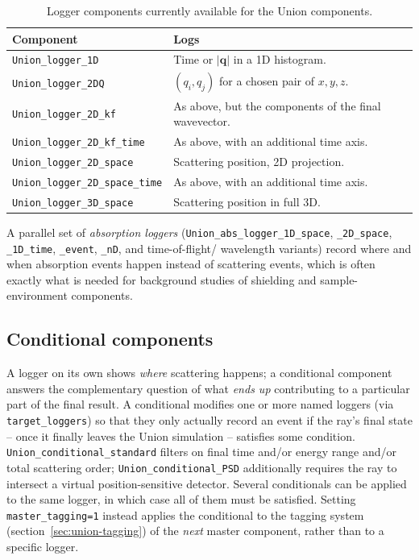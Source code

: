 \begin{table}[htb!]
  \begin{center}
    {\let\my=\\
    \begin{tabular}{|l|p{}|}
      \hline
      \textbf{Component} & \textbf{Logs} \\
      \hline
      \texttt{Union\_logger\_1D} & Time or $|\mathbf{q}|$ in a 1D histogram. \\
      \texttt{Union\_logger\_2DQ} & $(q_i,q_j)$ for a chosen pair of $x,y,z$. \\
      \texttt{Union\_logger\_2D\_kf} & As above, but the components of the final wavevector. \\
      \texttt{Union\_logger\_2D\_kf\_time} & As above, with an additional time axis. \\
      \texttt{Union\_logger\_2D\_space} & Scattering position, 2D projection. \\
      \texttt{Union\_logger\_2D\_space\_time} & As above, with an additional time axis. \\
      \texttt{Union\_logger\_3D\_space} & Scattering position in full 3D. \\
      \hline
    \end{tabular}
    \caption{Logger components currently available for the Union components.}
    \label{t:union-loggers}
    }
  \end{center}
\end{table}

A parallel set of \emph{absorption loggers}
(\texttt{Union\_abs\_logger\_1D\_space}, \texttt{\_2D\_space},
\texttt{\_1D\_time}, \texttt{\_event}, \texttt{\_nD}, and time-of-flight/
wavelength variants) record where and when absorption events happen instead
of scattering events, which is often exactly what is needed for background
studies of shielding and sample-environment components.

\subsection{Conditional components}
\label{sec:union-conditionals}

A logger on its own shows \emph{where} scattering happens; a conditional
component answers the complementary question of what \emph{ends up}
contributing to a particular part of the final result. A conditional
modifies one or more named loggers (via \texttt{target\_loggers}) so that
they only actually record an event if the ray's final state -- once it
finally leaves the Union simulation -- satisfies some condition.
\texttt{Union\_conditional\_standard} filters on final time and/or energy
range and/or total scattering order; \texttt{Union\_conditional\_PSD}
additionally requires the ray to intersect a virtual position-sensitive
detector. Several conditionals can be applied to the same logger, in which
case all of them must be satisfied. Setting \texttt{master\_tagging=1}
instead applies the conditional to the tagging system
(section~\ref{sec:union-tagging}) of the \emph{next} master component,
rather than to a specific logger.

